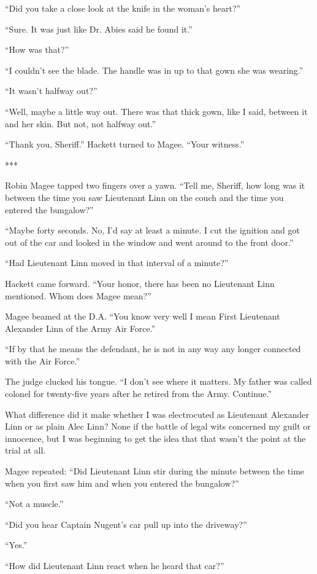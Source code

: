 {“Did you take a close look at the knife in the woman’s heart?”

“Sure. It was just like Dr. Abies said he found it.”

“How was that?”

“I couldn’t see the blade. The handle was in up to that gown she was wearing.”

“It wasn’t halfway out?”

“Well, maybe a little way out. There was that thick gown, like I said, between it and her skin. But not, not halfway out.”

“Thank you, Sheriff.” Hackett turned to Magee. “Your witness.”

***

Robin Magee tapped two fingers over a yawn. “Tell me, Sheriff, how long was it between the time you saw Lieutenant Linn on the couch and the time you entered the bungalow?”

“Maybe forty seconds. No, I’d say at least a minute. I cut the ignition and got out of the car and looked in the window and went around to the front door.”

“Had Lieutenant Linn moved in that interval of a minute?”

Hackett came forward. “Your honor, there has been no Lieutenant Linn mentioned. Whom does Magee mean?”

Magee beamed at the D.A. “You know very well I mean First Lieutenant Alexander Linn of the Army Air Force.”

“If by that he means the defendant, he is not in any way any longer connected with the Air Force.”

The judge clucked his tongue. “I don’t see where it matters. My father was called colonel for twenty-five years after he retired from the Army. Continue.”

What difference did it make whether I was electrocuted as Lieutenant Alexander Linn or as plain Alec Linn? None if the battle of legal wits concerned my guilt or innocence, but I was beginning to get the idea that that wasn’t the point at the trial at all.

Magee repeated: “Did Lieutenant Linn stir during the minute between the time when you first saw him and when you entered the bungalow?”

“Not a muscle.”

“Did you hear Captain Nugent’s car pull up into the driveway?”

“Yes.”

“How did Lieutenant Linn react when he heard that car?”

}
